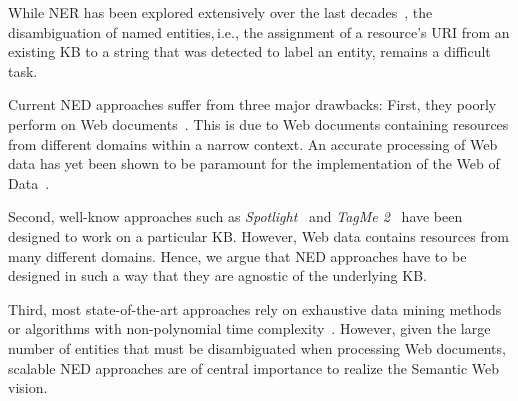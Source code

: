 While \ac{NER} has been explored extensively over the last decades~\cite{StanfordNER}, the disambiguation of named entities,\,i.e., the assignment of a resource's URI from an existing \ac{KB} to a string that was detected to label an entity, remains a difficult task.

Current \ac{NED} approaches suffer from three major drawbacks:
First, they poorly perform on Web documents~\cite{RatinovRo09}.
This is due to Web documents containing resources from different domains within a narrow context.
An accurate processing of Web data has yet been shown to be paramount for the implementation of the Web of Data~\cite{GER+13}.

Second, well-know approaches such as \emph{Spotlight}~\cite{spotlight} and \emph{TagMe 2}~\cite{TagMe2} have been designed to work on a particular \ac{KB}.
However, Web data contains resources from many different domains.
Hence, we argue that \ac{NED} approaches have to be designed in such a way that they are agnostic of the underlying \ac{KB}.

Third, most state-of-the-art approaches rely on exhaustive data mining methods~\cite{Cucerzan07,rat:rot} or algorithms with non-polynomial time complexity~\cite{Kleb11WIMS}.
However, given the large number of entities that must be disambiguated when processing Web documents, scalable \ac{NED} approaches are of central importance to realize the Semantic Web vision.


